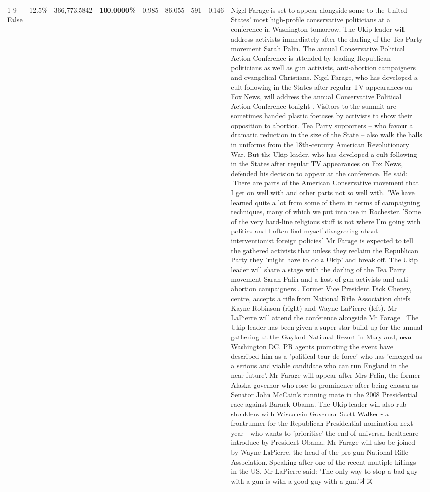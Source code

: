\begin{table}[H]
\begin{tabular}{lllrlllll}
\cline{1-9} \cline{2-9}
False & 12.5\% & 366,773.5842 & \bfseries \color{red} 100.0000\% & 0.985 & 86.055 & 591 & 0.146 & Nigel Farage is set to appear alongside some to the United States' most high-profile conservative politicians at a conference in Washington tomorrow. The Ukip leader will address activists immediately after the darling of the Tea Party movement Sarah Palin. The annual Conservative Political Action Conference is attended by leading Republican politicians as well as gun activists, anti-abortion campaigners and evangelical Christians. Nigel Farage, who has developed a cult following in the States after regular TV appearances on Fox News, will address the annual Conservative Political Action Conference tonight . Visitors to the summit are sometimes handed plastic foetuses by activists to show their opposition to abortion. Tea Party supporters – who favour a dramatic reduction in the size of the State – also walk the halls in uniforms from the 18th-century American Revolutionary War. But the Ukip leader, who has developed a cult following in the States after regular TV appearances on Fox News, defended his decision to appear at the conference. He said: 'There are parts of the American Conservative movement that I get on well with and other parts not so well with. 'We have learned quite a lot from some of them in terms of campaigning techniques, many of which we put into use in Rochester. 'Some of the very hard-line religious stuff is not where I'm going with politics and I often find myself disagreeing about interventionist foreign policies.' Mr Farage is expected to tell the gathered activists that unless they reclaim the Republican Party they 'might have to do a Ukip' and break off. The Ukip leader will share a stage with the darling of the Tea Party movement Sarah Palin and a host of gun activists and anti-abortion campaigners . Former Vice President Dick Cheney, centre, accepts a rifle from National Rifle Association chiefs Kayne Robinson (right) and Wayne LaPierre (left). Mr LaPierre will attend the conference alongside Mr Farage . The Ukip leader has been given a super-star build-up for the annual gathering at the Gaylord National Resort in Maryland, near Washington DC. PR agents promoting the event have described him as a 'political tour de force' who has 'emerged as a serious and viable candidate who can run England in the near future'. Mr Farage will appear after Mrs Palin, the former Alaska governor who rose to prominence after being chosen as Senator John McCain's running mate in the 2008 Presidential race against Barack Obama. The Ukip leader will also rub shoulders with Wisconsin Governor Scott Walker - a frontrunner for the Republican Presidential nomination next year - who wants to 'prioritise' the end of universal healthcare introduce by President Obama. Mr Farage will also be joined by Wayne LaPierre, the head of the pro-gun National Rifle Association. Speaking after one of the recent multiple killings in the US, Mr LaPierre said: 'The only way to stop a bad guy with a gun is with a good guy with a gun.'オス \\

\end{tabular}
\end{table}
